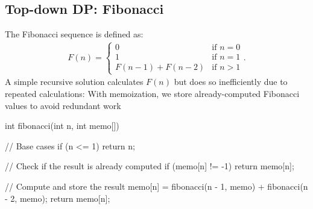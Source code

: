\documentclass{report}
\begin{document}
\subsection{Top-down DP: Fibonacci}
\bigbreak \noindent 
The Fibonacci sequence is defined as:
\begin{align*}
    F(n) = \begin{cases}
        0 & \text{if } n = 0 \\    
        1 & \text{if } n = 1    \\ 
        F(n-1) + F(n-2) &\text{if } n > 1
    \end{cases}
.\end{align*}
\bigbreak \noindent 
A simple recursive solution calculates $F(n)$ but does so inefficiently due to repeated calculations:
\bigbreak \noindent 
With memoization, we store already-computed Fibonacci values to avoid redundant work
\bigbreak \noindent 
\begin{cppcode}
    int fibonacci(int n, int memo[]) {
        // Base cases
        if (n <= 1) return n;

        // Check if the result is already computed
        if (memo[n] != -1) return memo[n];

        // Compute and store the result
        memo[n] = fibonacci(n - 1, memo) + fibonacci(n - 2, memo);
        return memo[n];
    }
\end{cppcode}




\pagebreak 
{}
\bigbreak \noindent 
\end{document}
